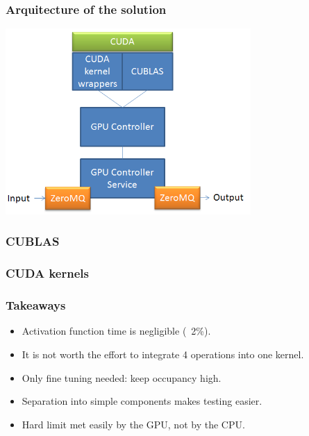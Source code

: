 \begin{frame}
\frametitle{Arquitecture of the solution}
\includegraphics[width=0.7\textwidth]{arq}
\end{frame}


\begin{frame}
      \frametitle{CUBLAS}
      
\end{frame}

\begin{frame}
      \frametitle{CUDA kernels}
      
\end{frame}

\begin{frame}
      \frametitle{Takeaways}
\begin{itemize}
\item Activation function time is negligible (~2\%).
\item It is not worth the effort to integrate 4 operations into one kernel.
\item Only fine tuning needed: keep occupancy high.
\item Separation into simple components makes testing easier.
\item Hard limit met easily by the GPU, not by the CPU.
\end{itemize}
\end{frame}



